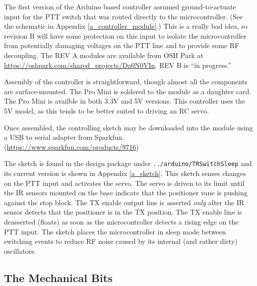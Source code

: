 \documentclass[12pt]{article}
\begin{document}
The first version of the Arduino based controller assumed ground-to-actuate
input for the PTT switch that was routed directly to the microcontroller.
(See the schematic in Appendix \ref{a_controller_module}.)
This is a really bad idea, so revision B will have some protection on this
input to isolate the microcontroller from potentially damaging voltages on the
PTT line and to provide some RF decoupling.
The REV A modules are available from OSH Park at \url{https://oshpark.com/shared_projects/Da0N0VIn}.
REV B is ``in progress.''

Assembly of the controller is straightforward, though almost all the components
are surface-mounted. The Pro Mini is soldered to the module as a daughter card.
The Pro Mini is availble in both 3.3V and 5V versions.  This controller uses the
5V model, as this tends to be better suited to driving an RC servo.

Once assembled, the controlling sketch may be downloaded into the module using a
USB to serial adapter from Sparkfun. (\url{https://www.sparkfun.com/products/9716})

The sketch is found in the design package under {\tt ../arduino/TRSwitchSleep}
and its current version is shown in Appendix \ref{a_sketch}. 
This sketch senses changes on the PTT input and activates the servo.
The servo is driven to its limit until the IR sensors mounted on the base indicate
that the positioner vane is pushing against the stop block. 
The TX enable output line is asserted {\em only} after the IR sensor detects
that the positioner is in the TX position.  The TX enable line is deasserted
(floats) as soon as the microcontroller detects a rising edge on the PTT input.
The sketch places the microcontroller in sleep mode between switching events to
reduce RF noise caused by its internal (and rather dirty) oscillators. 

\subsection{The Mechanical Bits}
\end{document}
